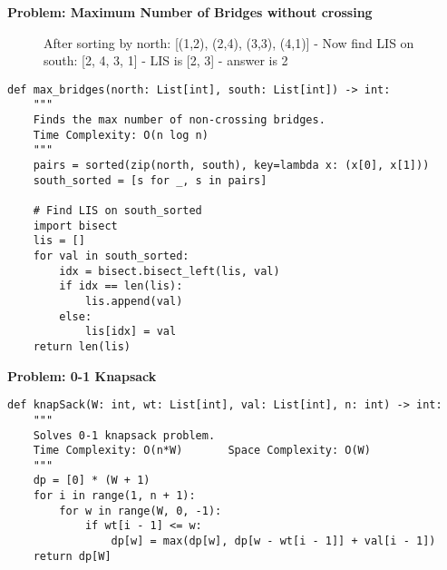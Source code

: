 \noindent\textbf{Problem: Maximum Number of Bridges without crossing}
\\
\begin{figure}[h!]
\centering
{}
\caption{After sorting by north: [(1,2), (2,4), (3,3), (4,1)] - 
Now find LIS on south: [2, 4, 3, 1] - LIS is [2, 3] - answer is 2}
\end{figure}
\begin{verbatim}
def max_bridges(north: List[int], south: List[int]) -> int:
    """
    Finds the max number of non-crossing bridges.
    Time Complexity: O(n log n)
    """
    pairs = sorted(zip(north, south), key=lambda x: (x[0], x[1]))
    south_sorted = [s for _, s in pairs]

    # Find LIS on south_sorted
    import bisect
    lis = []
    for val in south_sorted:
        idx = bisect.bisect_left(lis, val)
        if idx == len(lis):
            lis.append(val)
        else:
            lis[idx] = val
    return len(lis)
\end{verbatim}
\noindent\textbf{Problem: 0-1 Knapsack}
\begin{verbatim}
def knapSack(W: int, wt: List[int], val: List[int], n: int) -> int:
    """
    Solves 0-1 knapsack problem.
    Time Complexity: O(n*W)       Space Complexity: O(W)
    """
    dp = [0] * (W + 1)
    for i in range(1, n + 1):
        for w in range(W, 0, -1):
            if wt[i - 1] <= w:
                dp[w] = max(dp[w], dp[w - wt[i - 1]] + val[i - 1])
    return dp[W]
\end{verbatim}

